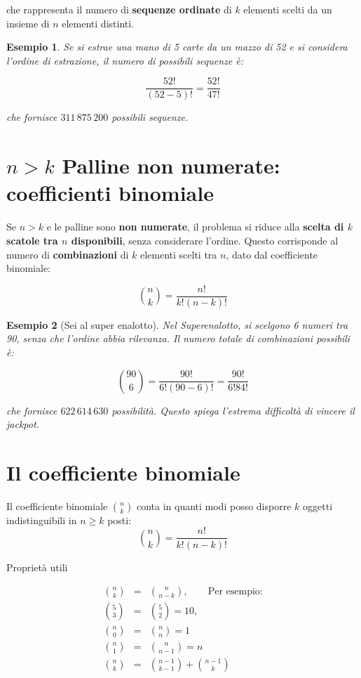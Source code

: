 \documentclass[
  11pt,
]{book}
\theoremstyle{mytheoremstyle}
\theoremstyle{mydefstyle}
\newtheorem{example}{{Esempio}}[section]
\begin{document}
che rappresenta il numero di \textbf{sequenze ordinate} di \(k\) elementi scelti da un insieme di \(n\) elementi distinti.

\begin{example}
Se si estrae una mano di 5 carte da un mazzo di 52 e si considera l'ordine di estrazione, il numero di possibili sequenze è:

\[
\frac{52!}{(52-5)!} = \frac{52!}{47!}
\]

che fornisce \(311\,875\,200\) possibili sequenze.
\end{example}

\section{\texorpdfstring{\(n > k\) Palline non numerate: coefficienti binomiale}{n \textgreater{} k Palline non numerate: coefficienti binomiale}}\label{n-k-palline-non-numerate-coefficienti-binomiale}

Se \(n > k\) e le palline sono \textbf{non numerate}, il problema si riduce alla \textbf{scelta di \(k\) scatole tra \(n\) disponibili}, senza considerare l'ordine. Questo corrisponde al numero di \textbf{combinazioni} di \(k\) elementi scelti tra \(n\), dato dal coefficiente binomiale:

\[
\binom{n}{k} = \frac{n!}{k!(n-k)!}
\]

\begin{example}[Sei al super enalotto]
Nel Superenalotto, si scelgono 6 numeri tra 90, senza che l'ordine abbia rilevanza. Il numero totale di combinazioni possibili è:

\[
\binom{90}{6} = \frac{90!}{6!(90-6)!} = \frac{90!}{6!84!}
\]

che fornisce \(622\,614\,630\) possibilità. Questo spiega l'estrema difficoltà di vincere il jackpot.
\end{example}

\section{Il coefficiente binomiale}\label{il-coefficiente-binomiale}

Il coefficiente binomiale \(\binom{n}{k}\) conta in quanti modi posso disporre \(k\) oggetti indistinguibili in \(n\ge k\) posti:
\[\binom{n}{ k}=\frac {n!}{k!(n-k)!}\]

Proprietà utili

\begin{eqnarray*}
  \binom{n}{ k} &=&\binom{n}{ n-k},\qquad\text{Per esempio:} \\
  \binom{5}{ 3} &=&\binom{5}{ 2}=10,\\
  \binom{n}{ 0} &=&\binom{n}{ n} = 1 \\
  \binom{n}{ 1} &=&\binom{n}{ n-1}=n \\
  \binom{n}{ k} &=&\binom{n-1}{k-1}+\binom{n-1}{k}
\end{eqnarray*}
\end{document}
